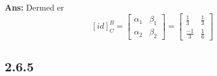 \documentclass[11pt]{article}
\newenvironment{solbox}
  {\begin{mdframed}[linewidth=1pt,linecolor=black,roundcorner=5pt]
   \noindent\textbf{Ans: }\enspace}
  {\end{mdframed}}
\begin{document}
\begin{solbox}
  Dermed er 
   \[
      \left[ id \right] _C^B = \begin{bmatrix}
        \alpha_{1}^{} &\beta_{1}^{} \\
        \alpha_{2}^{} &\beta_2
      \end{bmatrix} = \begin{bmatrix}
        \frac{1} {3}  & \frac{1} {3}  \\
        \frac{-1} {3}  & \frac{1} {6} 
      \end{bmatrix}
  \]
  
\end{solbox}

\subsection{2.6.5}
\end{document}
